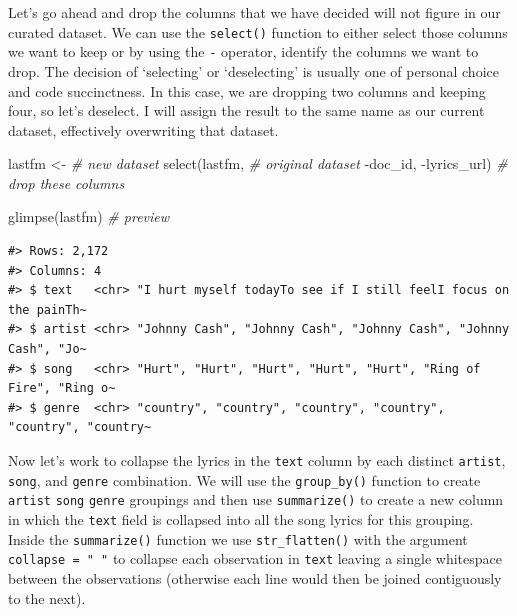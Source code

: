 \documentclass[
  letterpaper,
]{scrbook}
\newenvironment{Shaded}{\begin{snugshade}}{\end{snugshade}}
\newcommand{\CommentTok}[1]{\textcolor[rgb]{0.00,0.00,0.00}{\textit{#1}}}
\newcommand{\FunctionTok}[1]{\textcolor[rgb]{0.00,0.00,0.00}{#1}}
\newcommand{\NormalTok}[1]{\textcolor[rgb]{0.00,0.00,0.00}{#1}}
\newcommand{\OtherTok}[1]{\textcolor[rgb]{0.00,0.00,0.00}{#1}}
\newcommand{\SpecialCharTok}[1]{\textcolor[rgb]{0.00,0.00,0.00}{#1}}
\begin{document}
Let's go ahead and drop the columns that we have decided will not figure
in our curated dataset. We can use the \texttt{select()} function to
either select those columns we want to keep or by using the \texttt{-}
operator, identify the columns we want to drop. The decision of
`selecting' or `deselecting' is usually one of personal choice and code
succinctness. In this case, we are dropping two columns and keeping
four, so let's deselect. I will assign the result to the same name as
our current dataset, effectively overwriting that dataset.

\begin{Shaded}
\begin{Highlighting}[]
\NormalTok{lastfm }\OtherTok{\textless{}{-}} \CommentTok{\# new dataset}
  \FunctionTok{select}\NormalTok{(lastfm, }\CommentTok{\# original dataset}
         \SpecialCharTok{{-}}\NormalTok{doc\_id, }\SpecialCharTok{{-}}\NormalTok{lyrics\_url) }\CommentTok{\# drop these columns}

\FunctionTok{glimpse}\NormalTok{(lastfm) }\CommentTok{\# preview}
\end{Highlighting}
\end{Shaded}

\begin{verbatim}
#> Rows: 2,172
#> Columns: 4
#> $ text   <chr> "I hurt myself todayTo see if I still feelI focus on the painTh~
#> $ artist <chr> "Johnny Cash", "Johnny Cash", "Johnny Cash", "Johnny Cash", "Jo~
#> $ song   <chr> "Hurt", "Hurt", "Hurt", "Hurt", "Hurt", "Ring of Fire", "Ring o~
#> $ genre  <chr> "country", "country", "country", "country", "country", "country~
\end{verbatim}

Now let's work to collapse the lyrics in the \texttt{text} column by
each distinct \texttt{artist}, \texttt{song}, and \texttt{genre}
combination. We will use the \texttt{group\_by()} function to create
\texttt{artist} \texttt{song} \texttt{genre} groupings and then use
\texttt{summarize()} to create a new column in which the \texttt{text}
field is collapsed into all the song lyrics for this grouping. Inside
the \texttt{summarize()} function we use \texttt{str\_flatten()} with
the argument \texttt{collapse\ =\ "\ "} to collapse each observation in
\texttt{text} leaving a single whitespace between the observations
(otherwise each line would then be joined contiguously to the next).
\end{document}
